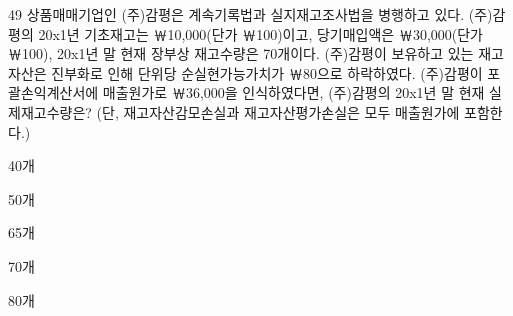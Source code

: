 \begin{question}{49}
상품매매기업인 (주)감평은 계속기록법과 실지재고조사법을 병행하고 있다. (주)감평의 20x1년 기초재고는 ￦10,000(단가 ￦100)이고, 당기매입액은 ￦30,000(단가 ￦100), 20x1년 말 현재 장부상 재고수량은 70개이다. (주)감평이 보유하고 있는 재고자산은 진부화로 인해 단위당 순실현가능가치가 ￦80으로 하락하였다.
(주)감평이 포괄손익계산서에 매출원가로 ￦36,000을 인식하였다면, (주)감평의 20x1년 말 현재 실제재고수량은? (단, 재고자산감모손실과 재고자산평가손실은 모두 매출원가에 포함한다.) \par
\begin{choices}
  \item 40개
  \item 50개
  \item 65개
  \item 70개
  \item 80개
\end{choices}
\end{question}
